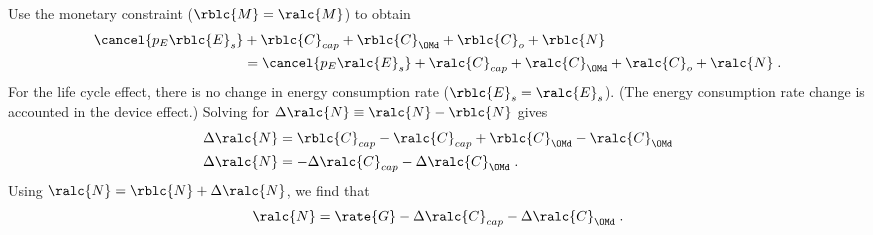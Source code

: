 \begin{landscape}
{    Use the monetary constraint ($\rblc{M} = \ralc{M}$) to obtain
  \begin{align} \label{M_dot_bal_lc}
  \cancel{p_E \rblc{E}_s} &+ \rblc{C}_{cap} + \rblc{C}_{\OMd} + \rblc{C}_o + \rblc{N} \nonumber \\
  &= \cancel{p_E \ralc{E}_s} + \ralc{C}_{cap} + \ralc{C}_{\OMd} + \ralc{C}_o  + \ralc{N} \; .
  \end{align}
  For the life cycle effect, 
  there is no change in energy consumption rate ($\rblc{E}_s = \ralc{E}_s$).
  (The energy consumption rate change is accounted in the device effect.)
  Solving for $\Delta \ralc{N} \equiv \ralc{N} - \rblc{N}$ gives
  \begin{align}
  \Delta \ralc{N} &= \rblc{C}_{cap} - \ralc{C}_{cap} + \rblc{C}_{\OMd} - \ralc{C}_{\OMd} \\
  \Delta \ralc{N} &= - \Delta \ralc{C}_{cap} - \Delta \ralc{C}_{\OMd} \; .
  \end{align}
  Using $\ralc{N} = \rblc{N} + \Delta \ralc{N}$, we find that
  \begin{equation}
  \ralc{N} = \rate{G} - \Delta \ralc{C}_{cap} - \Delta \ralc{C}_{\OMd} \; .
  \end{equation}
}

\end{landscape}